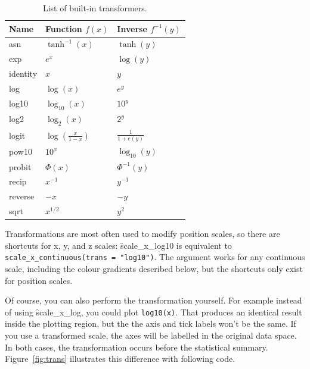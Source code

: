 \begin{table}
  \centering
  \begin{tabular}{lll}
    \toprule
    Name & Function $f(x)$ & Inverse $f^{-1}(y)$ \\
    \midrule
    asn       & $\tanh^{-1}(x)$ & $\tanh(y)$ \\
    exp       & $e ^ x$         & $\log(y)$  \\
    identity  & $x$             & $y$        \\
    log       & $\log(x)$       & $e ^ y$    \\
    log10     & $\log_{10}(x)$  & $10 ^ y$   \\
    log2      & $\log_2(x)$     & $2 ^ y$    \\
    logit     & $\log(\frac{x}{1 - x})$ & $\frac{1}{1 + e(y)} $ \\
    pow10     & $10^x$          & $\log_{10}(y) $ \\
    probit    & $\Phi(x)$       & $\Phi^{-1}(y)$ \\
    recip     & $x^{-1}$        & $y^{-1}$ \\
    reverse   & $-x$            & $-y$     \\
    sqrt      & $x^{1/2}$       & $y ^ 2$  \\
    \bottomrule
  \end{tabular}
  \caption{List of built-in transformers.}
  \label{tbl:common-trans}
\end{table}

Transformations are most often used to modify position scales, so there are shortcuts for x, y, and z scales: \f{scale_x_log10} is equivalent to \verb|scale_x_continuous(trans = "log10")|.  The  argument works for any continuous scale, including the colour gradients described below, but the shortcuts only exist for position scales.

Of course, you can also perform the transformation yourself. For example instead of using \f{scale_x_log}, you could plot {\tt log10(x)}. That produces an identical result inside the plotting region, but the the axis and tick labels won't be the same. If you use a transformed scale, the axes will be labelled in the original data space. In both cases, the transformation occurs before the statistical summary. Figure~\ref{fig:trans} illustrates this difference with following code.

% 


